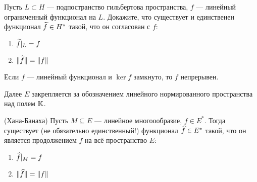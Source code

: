 \begin{exercise}
	Пусть $L \subset H$ --- подпостранство гильбертова пространства, $f$ --- линейный ограниченный функционал на $L$. Докажите, что существует и единственен функционал $\widetilde{f} \in H^*$ такой, что он согласован с $f$:
	\begin{enumerate}
		\item $\widetilde{f}|_L = f$
		
		\item $\|\widetilde{f}\| = \|f\|$
	\end{enumerate}
\end{exercise}

\begin{exercise}
	Если $f$ --- линейный функционал и $\ker f$ замкнуто, то $f$ непрерывен.
\end{exercise}

\begin{note}
	Далее $E$ закрепляется за обозначением линейного нормированного пространства над полем $\mathbb{K}$.
\end{note}

\begin{theorem} (Хана-Банаха)
	Пусть $M \subseteq E$ --- линейное многоообразие, $f \in E^*$. Тогда существует (не обязательно единственный!) функционал $\widehat{f} \in E^*$ такой, что он является продолжением $f$ на всё пространство $E$:
	\begin{enumerate}
		\item $\widehat{f}|_M = f$
		
		\item $\|\widehat{f}\| = \|f\|$
	\end{enumerate}
\end{theorem}